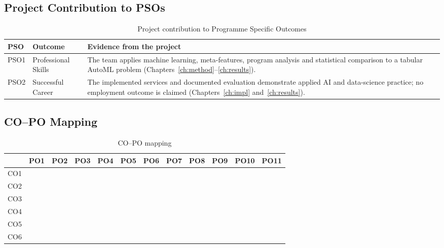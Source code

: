 \subsection{Project Contribution to PSOs}

\begin{table}[H]
\centering
\caption{Project contribution to Programme Specific Outcomes}
\label{tab:project-pso}
\small
\setlength{\tabcolsep}{4pt}
\renewcommand{\arraystretch}{1.2}
\begin{tabular}{@{}>{\raggedright\arraybackslash}p{1.1cm}
  >{\raggedright\arraybackslash}p{3.6cm}
  >{\raggedright\arraybackslash}p{9.1cm}@{}}
\toprule
\textbf{PSO} & \textbf{Outcome} & \textbf{Evidence from the project} \\
\midrule
PSO1 & Professional Skills & The team applies machine learning,
meta-features, program analysis and statistical comparison to a
tabular AutoML problem (Chapters~\ref{ch:method}--\ref{ch:results}). \\
PSO2 & Successful Career & The implemented services and documented
evaluation demonstrate applied AI and data-science practice; no
employment outcome is claimed (Chapters~\ref{ch:impl}
and~\ref{ch:results}). \\
\bottomrule
\end{tabular}
\end{table}

\subsection{CO--PO Mapping}

\begin{table}[H]
\centering
\caption{CO--PO mapping}
\label{tab:co-po}
\small
\setlength{\tabcolsep}{4.5pt}
\renewcommand{\arraystretch}{1.8}
\begin{tabular}{@{}l*{11}{c}@{}}
\toprule
 & PO1 & PO2 & PO3 & PO4 & PO5 & PO6 & PO7 & PO8 & PO9 & PO10 & PO11 \\
\midrule
CO1 & & & & & & & & & & & \\
CO2 & & & & & & & & & & & \\
CO3 & & & & & & & & & & & \\
CO4 & & & & & & & & & & & \\
CO5 & & & & & & & & & & & \\
CO6 & & & & & & & & & & & \\
\bottomrule
\end{tabular}
\end{table}

